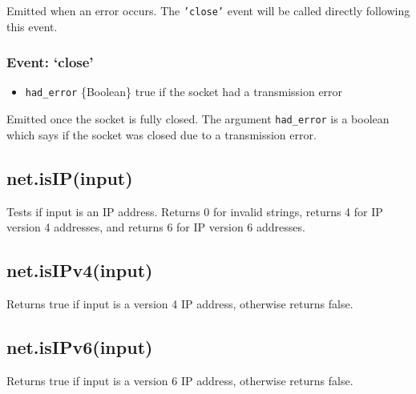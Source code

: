 Emitted when an error occurs. The \texttt{'close'} event will be called
directly following this event.

\subsubsection{Event: `close'}

\begin{itemize}
\item
  \texttt{had\_error} \{Boolean\} true if the socket had a transmission
  error
\end{itemize}

Emitted once the socket is fully closed. The argument
\texttt{had\_error} is a boolean which says if the socket was closed due
to a transmission error.

\subsection{net.isIP(input)}

Tests if input is an IP address. Returns 0 for invalid strings, returns
4 for IP version 4 addresses, and returns 6 for IP version 6 addresses.

\subsection{net.isIPv4(input)}

Returns true if input is a version 4 IP address, otherwise returns
false.

\subsection{net.isIPv6(input)}

Returns true if input is a version 6 IP address, otherwise returns
false.
